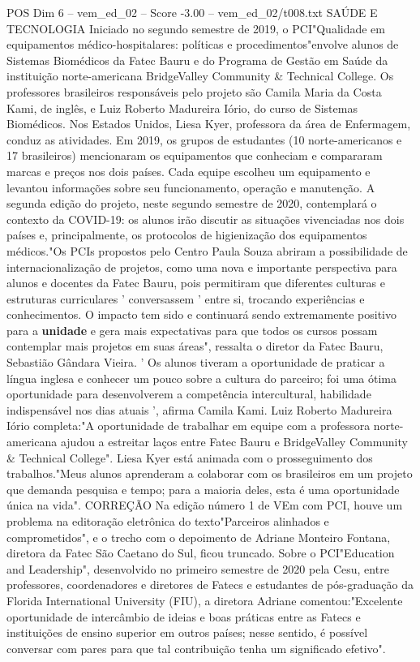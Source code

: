 \begin{textsample}{POS Dim 6 – vem\_ed\_02 – Score -3.00 – vem\_ed\_02/t008.txt}  \label{ex:f6_pos_108}
SAÚDE E TECNOLOGIA Iniciado no segundo semestre de 2019, o PCI"Qualidade em equipamentos médico-hospitalares: políticas e procedimentos"envolve alunos de Sistemas Biomédicos da Fatec Bauru e do Programa de Gestão em Saúde da instituição norte-americana BridgeValley Community \& Technical College.
Os professores brasileiros responsáveis pelo projeto são Camila Maria da Costa Kami, de inglês, e Luiz Roberto Madureira Iório, do curso de Sistemas Biomédicos.
Nos Estados Unidos, Liesa Kyer, professora da área de Enfermagem, conduz as atividades.
Em 2019, os grupos de estudantes (10 norte-americanos e 17 brasileiros) mencionaram os equipamentos que conheciam e compararam marcas e preços nos dois países.
Cada equipe escolheu um equipamento e levantou informações sobre seu funcionamento, operação e manutenção.
A segunda edição do projeto, neste segundo semestre de 2020, contemplará o contexto da COVID-19: os alunos irão discutir as situações vivenciadas nos dois países e, principalmente, os protocolos de higienização dos equipamentos médicos."Os PCIs propostos pelo Centro Paula Souza abriram a possibilidade de internacionalização de projetos, como uma nova e importante perspectiva para alunos e docentes da Fatec Bauru, pois permitiram que diferentes culturas e estruturas curriculares ' conversassem ' entre si, trocando experiências e conhecimentos.
O impacto tem sido e continuará sendo extremamente positivo para a \textbf{unidade} e gera mais expectativas para que todos os cursos possam contemplar mais projetos em suas áreas", ressalta o diretor da Fatec Bauru, Sebastião Gândara Vieira. ' Os alunos tiveram a oportunidade de praticar a língua inglesa e conhecer um pouco sobre a cultura do parceiro; foi uma ótima oportunidade para desenvolverem a competência intercultural, habilidade indispensável nos dias atuais ', afirma Camila Kami.
Luiz Roberto Madureira Iório completa:"A oportunidade de trabalhar em equipe com a professora norte-americana ajudou a estreitar laços entre Fatec Bauru e BridgeValley Community \& Technical College".
Liesa Kyer está animada com o prosseguimento dos trabalhos."Meus alunos aprenderam a colaborar com os brasileiros em um projeto que demanda pesquisa e tempo; para a maioria deles, esta é uma oportunidade única na vida".
CORREÇÃO Na edição número 1 de VEm com PCI, houve um problema na editoração eletrônica do texto"Parceiros alinhados e comprometidos", e o trecho com o depoimento de Adriane Monteiro Fontana, diretora da Fatec São Caetano do Sul, ficou truncado.
Sobre o PCI"Education and Leadership", desenvolvido no primeiro semestre de 2020 pela Cesu, entre professores, coordenadores e diretores de Fatecs e estudantes de pós-graduação da Florida International University (FIU), a diretora Adriane comentou:"Excelente oportunidade de intercâmbio de ideias e boas práticas entre as Fatecs e instituições de ensino superior em outros países; nesse sentido, é possível conversar com pares para que tal contribuição tenha um significado efetivo".

\end{textsample}
